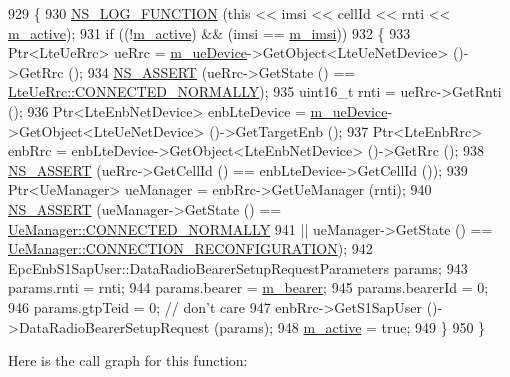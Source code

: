 \begin{DoxyCode}
929 \{ 
930   \hyperlink{log-macros-disabled_8h_a90b90d5bad1f39cb1b64923ea94c0761}{NS\_LOG\_FUNCTION} (\textcolor{keyword}{this} << imsi << cellId << rnti << \hyperlink{classns3_1_1DrbActivator_ae43059256ef63105b760dc715dafa4cf}{m\_active});
931   \textcolor{keywordflow}{if} ((!\hyperlink{classns3_1_1DrbActivator_ae43059256ef63105b760dc715dafa4cf}{m\_active}) && (imsi == \hyperlink{classns3_1_1DrbActivator_a409d601e99df7e2c18fb827115e52695}{m\_imsi}))
932     \{
933       Ptr<LteUeRrc> ueRrc = \hyperlink{classns3_1_1DrbActivator_aaf698604ccc229d99c944a390222e9b4}{m\_ueDevice}->GetObject<LteUeNetDevice> ()->GetRrc ();
934       \hyperlink{assert_8h_a6dccdb0de9b252f60088ce281c49d052}{NS\_ASSERT} (ueRrc->GetState () == \hyperlink{classns3_1_1LteUeRrc_a241012c291e75681150c9214e11f6145a29dc4c52bd374f1b78508fb725de9999}{LteUeRrc::CONNECTED\_NORMALLY});
935       uint16\_t rnti = ueRrc->GetRnti ();
936       Ptr<LteEnbNetDevice> enbLteDevice = \hyperlink{classns3_1_1DrbActivator_aaf698604ccc229d99c944a390222e9b4}{m\_ueDevice}->GetObject<LteUeNetDevice> ()->GetTargetEnb 
      ();
937       Ptr<LteEnbRrc> enbRrc = enbLteDevice->GetObject<LteEnbNetDevice> ()->GetRrc ();
938       \hyperlink{assert_8h_a6dccdb0de9b252f60088ce281c49d052}{NS\_ASSERT} (ueRrc->GetCellId () == enbLteDevice->GetCellId ());
939       Ptr<UeManager> ueManager = enbRrc->GetUeManager (rnti);
940       \hyperlink{assert_8h_a6dccdb0de9b252f60088ce281c49d052}{NS\_ASSERT} (ueManager->GetState () == 
      \hyperlink{classns3_1_1UeManager_a2f4085fdd18d7125c27da44a5b8b6808a2a1020dce30f19aa9354ba34b2e7c5e0}{UeManager::CONNECTED\_NORMALLY}
941                  || ueManager->GetState () == 
      \hyperlink{classns3_1_1UeManager_a2f4085fdd18d7125c27da44a5b8b6808abd13cee86acc2cb3c04241dec919c73f}{UeManager::CONNECTION\_RECONFIGURATION});
942       EpcEnbS1SapUser::DataRadioBearerSetupRequestParameters params;
943       params.rnti = rnti;
944       params.bearer = \hyperlink{classns3_1_1DrbActivator_a2ff495714c871e28e112fa5d4d8efb53}{m\_bearer};
945       params.bearerId = 0;
946       params.gtpTeid = 0; \textcolor{comment}{// don't care}
947       enbRrc->GetS1SapUser ()->DataRadioBearerSetupRequest (params);
948       \hyperlink{classns3_1_1DrbActivator_ae43059256ef63105b760dc715dafa4cf}{m\_active} = \textcolor{keyword}{true};
949     \}
950 \}
\end{DoxyCode}


Here is the call graph for this function\+:




